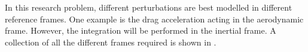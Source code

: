 In this research problem, different perturbations are best modelled in different reference frames. One example is the drag acceleration acting in the aerodynamic frame. However, the integration will be performed in the inertial frame. A collection of all the different frames required is shown in .

\begin{figure}[H]
\centering
{} 
\\
 

\end{figure}
